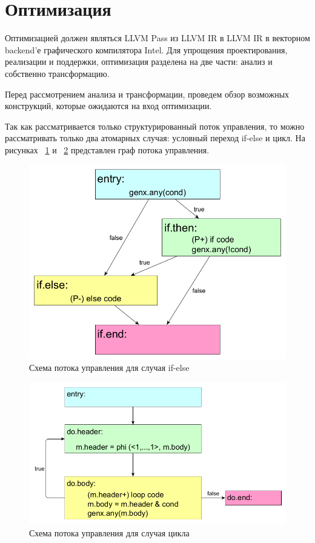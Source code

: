 \section{Оптимизация}
\label{sec:Optimization}

Оптимизацией должен являться LLVM Pass из LLVM IR в LLVM IR в векторном
backend'е графического компилятора Intel. Для упрощения проектирования,
реализации и поддержки, оптимизация разделена на две части: анализ и собственно
трансформацию.

Перед рассмотрением анализа и трансформации,
проведем обзор возможных конструкций, которые ожидаются на вход оптимизации.

Так как рассматривается только структурированный поток управления, то можно
рассматривать только два атомарных случая: условный переход if-else и цикл.
На рисунках ~\ref{fig:if-else-simdcf-simple} и ~\ref{fig:loop-simdcf-simple}
представлен граф потока управления.
\begin{figure}
  \centering
  \includegraphics[scale=0.27]{Images/if-else-FE-colored.png}
  \caption{Схема потока управления для случая if-else}
  \label{fig:if-else-simdcf-simple}
\end{figure}
\begin{figure}
  \centering
  \includegraphics[scale=0.27]{Images/do-while-FE-colored.png}
  \caption{Схема потока управления для случая цикла}
  \label{fig:loop-simdcf-simple}
\end{figure}

